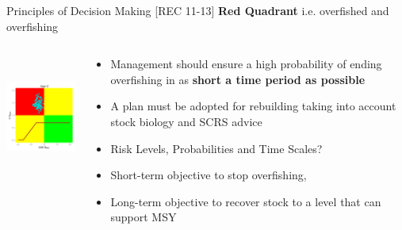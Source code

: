\documentclass{beamer}
\newcommand\Fontviii{\fontsize{8}{10}\selectfont}
\begin{document}
\begin{frame}{Principles of Decision Making [REC 11-13]}
   \smallskip\textbf{Red Quadrant} i.e. overfished and overfishing\smallskip\\
  \begin{columns}[t] %
   \begin{column}[T]{5cm} %
    \includegraphics[height=40mm]{hcrI1.png}
   \end{column}
   \begin{column}[T]{6cm} %
   \Fontviii
   \begin{itemize}%
       \item Management should ensure a high probability of ending overfishing in as \textbf{short a time period as possible}
       \item A plan must be adopted for rebuilding taking into account stock biology and SCRS advice
       \item Risk Levels, Probabilities and Time Scales?
       \item Short-term objective to stop overfishing,
       \item Long-term objective to recover stock to a level that can support MSY
   \end{itemize}
   \end{column}
\end{columns}
\end{frame}
     

\end{document}
